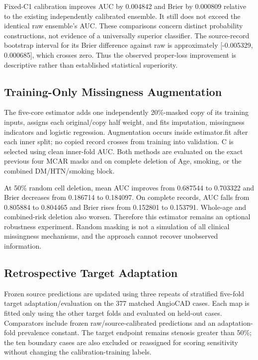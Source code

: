 \documentclass[conference]{IEEEtran}
\begin{document}
Fixed-C1 calibration improves AUC by 0.004842 and Brier by 0.000809 relative to the existing independently calibrated ensemble. It still does not exceed the identical raw ensemble's AUC. These comparisons concern distinct probability constructions, not evidence of a universally superior classifier. The source-record bootstrap interval for its Brier difference against raw is approximately [-0.005329, 0.000685], which crosses zero. Thus the observed proper-loss improvement is descriptive rather than established statistical superiority.

\subsection{Training-Only Missingness Augmentation}
The five-core estimator adds one independently 20\%-masked copy of its training inputs, assigns each original/copy half weight, and fits imputation, missingness indicators and logistic regression. Augmentation occurs inside estimator.fit after each inner split; no copied record crosses from training into validation. C is selected using clean inner-fold AUC. Both methods are evaluated on the exact previous four MCAR masks and on complete deletion of Age, smoking, or the combined DM/HTN/smoking block.

At 50\% random cell deletion, mean AUC improves from 0.687544 to 0.703322 and Brier decreases from 0.186714 to 0.184097. On complete records, AUC falls from 0.805884 to 0.804465 and Brier rises from 0.152801 to 0.153791. Whole-age and combined-risk deletion also worsen. Therefore this estimator remains an optional robustness experiment. Random masking is not a simulation of all clinical missingness mechanisms, and the approach cannot recover unobserved information.

\subsection{Retrospective Target Adaptation}
Frozen source predictions are updated using three repeats of stratified five-fold target adaptation/evaluation on the 377 matched AngioCAD cases. Each map is fitted only using the other target folds and evaluated on held-out cases. Comparators include frozen raw/source-calibrated predictions and an adaptation-fold prevalence constant. The target endpoint remains stenosis greater than 50\%; the ten boundary cases are also excluded or reassigned for scoring sensitivity without changing the calibration-training labels.
\end{document}
